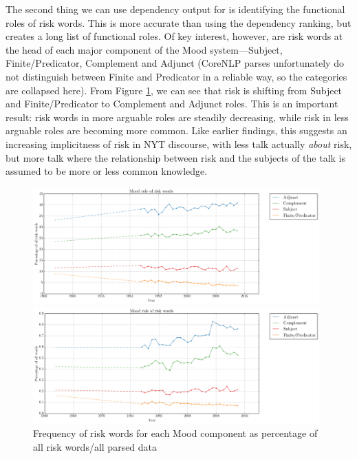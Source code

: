 
    The second thing we can use dependency output for is identifying the functional roles of risk words. This is more accurate than using the dependency ranking, but creates a long list of functional roles. Of key interest, however, are risk words at the head of each major component of the Mood system---Subject, Finite\slash Predicator, Complement and Adjunct (CoreNLP parses unfortunately do not distinguish between Finite and Predicator in a reliable way, so the categories are collapsed here). From Figure \ref{fig:interpersonalarg}, we can see that risk is shifting from Subject and Finite\slash Predicator to Complement and Adjunct roles. This is an important result: risk words in more arguable roles are steadily decreasing, while risk in less arguable roles are becoming more common. Like earlier findings, this suggests an increasing implicitness of risk in NYT discourse, with less talk actually \emph{about} risk, but more talk where the relationship between risk and the subjects of the talk is assumed to be more or less common knowledge.

    \noindent
    \begin{figure}[htb!]
    \centering
    \begin{minipage}{.48\textwidth}
    \centering
    \includegraphics[width=0.98\textwidth]{../images/mood_role_of_risk_words.png}
    \end{minipage}%
    \begin{minipage}{.48\textwidth}
    \centering
    \includegraphics[width=0.98\textwidth]{../images/riskdep_allwords.png}
    \end{minipage}
    \caption{Frequency of risk words for each Mood component as percentage of all risk words\slash all parsed data}
    \label{fig:interpersonalarg}
    \end{figure}


